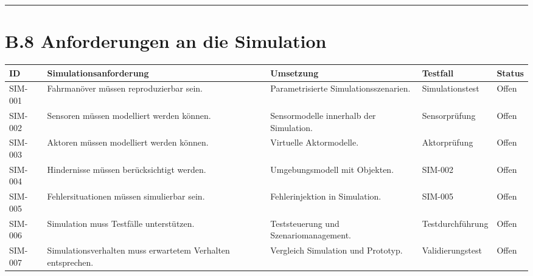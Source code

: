 \documentclass[
  a4paper,
  12pt,
  DIV=12,        %
  parskip=half,  %
  headings=small %
]{scrartcl}
\theoremstyle{definition}
\theoremstyle{definition}
\begin{document}
\begin{center}\rule{0.5\linewidth}{0.5pt}\end{center}

\section{B.8 Anforderungen an die
Simulation}\label{b.8-anforderungen-an-die-simulation}

\begin{longtable}[]{@{}
  >{\raggedright\arraybackslash}p{}
  >{\raggedright\arraybackslash}p{}
  >{\raggedright\arraybackslash}p{}
  >{\raggedright\arraybackslash}p{}
  >{\raggedright\arraybackslash}p{}@{}}
\toprule\noalign{}
\begin{minipage}[b]{\linewidth}\raggedright
ID
\end{minipage} & \begin{minipage}[b]{\linewidth}\raggedright
Simulationsanforderung
\end{minipage} & \begin{minipage}[b]{\linewidth}\raggedright
Umsetzung
\end{minipage} & \begin{minipage}[b]{\linewidth}\raggedright
Testfall
\end{minipage} & \begin{minipage}[b]{\linewidth}\raggedright
Status
\end{minipage} \\
\midrule\noalign{}
\endhead
\bottomrule\noalign{}
\endlastfoot
SIM-001 & Fahrmanöver müssen reproduzierbar sein. & Parametrisierte
Simulationsszenarien. & Simulationstest & Offen \\
SIM-002 & Sensoren müssen modelliert werden können. & Sensormodelle
innerhalb der Simulation. & Sensorprüfung & Offen \\
SIM-003 & Aktoren müssen modelliert werden können. & Virtuelle
Aktormodelle. & Aktorprüfung & Offen \\
SIM-004 & Hindernisse müssen berücksichtigt werden. & Umgebungsmodell
mit Objekten. & SIM-002 & Offen \\
SIM-005 & Fehlersituationen müssen simulierbar sein. & Fehlerinjektion
in Simulation. & SIM-005 & Offen \\
SIM-006 & Simulation muss Testfälle unterstützen. & Teststeuerung und
Szenariomanagement. & Testdurchführung & Offen \\
SIM-007 & Simulationsverhalten muss erwartetem Verhalten entsprechen. &
Vergleich Simulation und Prototyp. & Validierungstest & Offen \\
\end{longtable}
\end{document}
